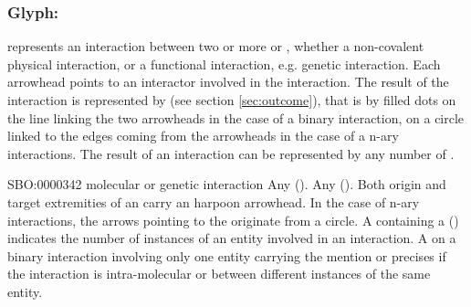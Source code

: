 \color{blue}

\subsubsection{Glyph: }\label{sec:interaction}

 represents an interaction between two or more  or , whether a non-covalent physical interaction, or a functional interaction, e.g. genetic interaction. Each arrowhead points to an interactor involved in the interaction. The result of the interaction is represented by  (see section \ref{sec:outcome}), that is by filled dots on the line linking the two arrowheads in the case of a binary interaction, on a circle linked to the edges coming from the arrowheads in the case of a  n-ary interactions. The result of an interaction can be represented by any number of .

\begin{glyphDescription}
 \glyphSboTerm SBO:0000342 molecular or genetic interaction
 \glyphOrigin Any  ().%
 \glyphTarget Any  ().%
 \glyphEndPoint Both origin and target extremities of an  carry an harpoon arrowhead. In the case of n-ary interactions, the arrows pointing to the  originate from a circle. 
\glyphAux A  containing a  () indicates the number of instances of an entity involved in an interaction. A  on a binary interaction involving only one entity carrying the mention  or  precises if the interaction is intra-molecular or between different instances of the same entity.
 \end{glyphDescription}

